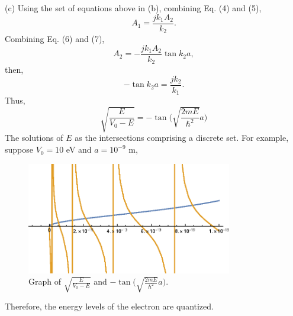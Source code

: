 \documentclass[a4paper]{article}
\begin{document}
(c) Using the set of equations above in (b), combining Eq. (4) and (5),
\begin{equation}
    A_1=\frac{jk_1A_2}{k_2}.
\end{equation}
Combining Eq. (6) and (7),
$$A_2=-\frac{jk_1A_2}{k_2}\tan{k_2a},$$
then,
$$-\tan{k_2a}=\frac{jk_2}{k_1}.$$
Thus,
$$\sqrt{\frac{E}{V_0-E}}=-\tan{\bigg(\sqrt{\frac{2mE}{\hbar^2}}a\bigg)}$$
The solutions of $E$ as the intersections comprising a discrete set. For example, suppose $V_0=10$ eV and $a=10^{-9}$ m,
\begin{figure}[H]
    \begin{center}
        \includegraphics[width=0.8\textwidth]{1-8(c).eps}
    \end{center}
    \caption{Graph of $\sqrt{\frac{E}{V_0-E}}$ and $-\tan{\big(\sqrt{\frac{2mE}{\hbar^2}}a\big)}$.}
\end{figure}
Therefore, the energy levels of the electron are quantized.
\end{document}
